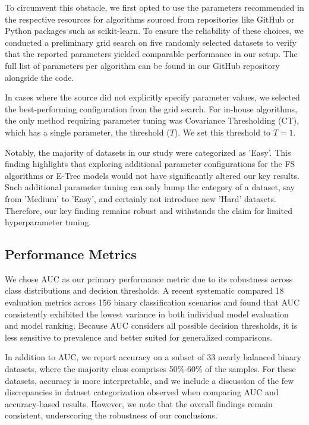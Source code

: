 \documentclass[preprint,12pt,authoryear]{elsarticle}
\begin{document}
To circumvent this obstacle, we first opted to use the parameters recommended in the respective resources for algorithms sourced from repositories like GitHub or Python packages such as scikit-learn. To ensure the reliability of these choices, we conducted a preliminary grid search on five randomly selected datasets to verify that the reported parameters yielded comparable performance in our setup. The full list of parameters per algorithm can be found in our GitHub repository alongside the code.

In cases where the source did not explicitly specify parameter values, we selected the best-performing configuration from the grid search. For in-house algorithms, the only method requiring parameter tuning was Covariance Thresholding (CT), which has a single parameter, the threshold (\(T\)). We set this threshold to \(T=1\). 

Notably, the majority of datasets in our study were categorized as 'Easy'. This finding highlights that exploring additional parameter configurations for the FS algorithms or E-Tree models would not have significantly altered our key results. Such additional parameter tuning can only bump the category of a dataset, say from 'Medium' to 'Easy', and certainly not introduce new 'Hard' datasets. 
Therefore, our key finding remains robust and withstands the claim for limited hyperparameter tuning.



\subsection{Performance Metrics}

We chose AUC as our primary performance metric due to its robustness across class distributions and decision thresholds. A recent systematic \cite{li2024area} compared 18 evaluation metrics across 156 binary classification scenarios and found that AUC consistently exhibited the lowest variance in both individual model evaluation and model ranking. Because AUC considers all possible decision thresholds, it is less sensitive to prevalence and better suited for generalized comparisons. 


In addition to AUC, we report accuracy on a subset of 33 nearly balanced binary datasets, where the majority class comprises 50\%-60\% of the samples. For these datasets, accuracy is more interpretable, and we include a discussion of the few discrepancies in dataset categorization observed when comparing AUC and accuracy-based results. However, we note that the overall findings remain consistent, underscoring the robustness of our conclusions.
\end{document}
